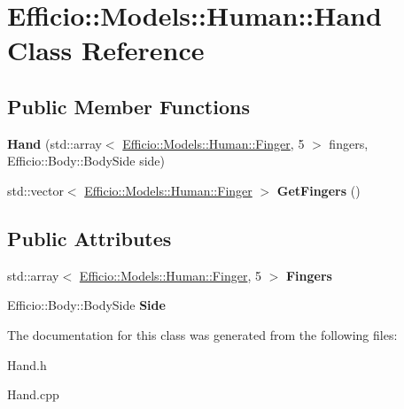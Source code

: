 \hypertarget{class_efficio_1_1_models_1_1_human_1_1_hand}{}\section{Efficio\+:\+:Models\+:\+:Human\+:\+:Hand Class Reference}
\label{class_efficio_1_1_models_1_1_human_1_1_hand}
\subsection*{Public Member Functions}
\begin{DoxyCompactItemize}
\item 
{\bfseries Hand} (std\+::array$<$ \hyperlink{class_efficio_1_1_models_1_1_human_1_1_finger}{Efficio\+::\+Models\+::\+Human\+::\+Finger}, 5 $>$ fingers, Efficio\+::\+Body\+::\+Body\+Side side)\hypertarget{class_efficio_1_1_models_1_1_human_1_1_hand_a53d27d7af57195c07152029bdbbc47d7}{}\label{class_efficio_1_1_models_1_1_human_1_1_hand_a53d27d7af57195c07152029bdbbc47d7}

\item 
std\+::vector$<$ \hyperlink{class_efficio_1_1_models_1_1_human_1_1_finger}{Efficio\+::\+Models\+::\+Human\+::\+Finger} $>$ {\bfseries Get\+Fingers} ()\hypertarget{class_efficio_1_1_models_1_1_human_1_1_hand_ad3d7739f65449a19f12489377ee45095}{}\label{class_efficio_1_1_models_1_1_human_1_1_hand_ad3d7739f65449a19f12489377ee45095}

\end{DoxyCompactItemize}
\subsection*{Public Attributes}
\begin{DoxyCompactItemize}
\item 
std\+::array$<$ \hyperlink{class_efficio_1_1_models_1_1_human_1_1_finger}{Efficio\+::\+Models\+::\+Human\+::\+Finger}, 5 $>$ {\bfseries Fingers}\hypertarget{class_efficio_1_1_models_1_1_human_1_1_hand_aa891b997e3148afe3f251fbbb1027145}{}\label{class_efficio_1_1_models_1_1_human_1_1_hand_aa891b997e3148afe3f251fbbb1027145}

\item 
Efficio\+::\+Body\+::\+Body\+Side {\bfseries Side}\hypertarget{class_efficio_1_1_models_1_1_human_1_1_hand_a9ead927dffc76db7a048cde9d3978c4d}{}\label{class_efficio_1_1_models_1_1_human_1_1_hand_a9ead927dffc76db7a048cde9d3978c4d}

\end{DoxyCompactItemize}


The documentation for this class was generated from the following files\+:\begin{DoxyCompactItemize}
\item 
Hand.\+h\item 
Hand.\+cpp\end{DoxyCompactItemize}
